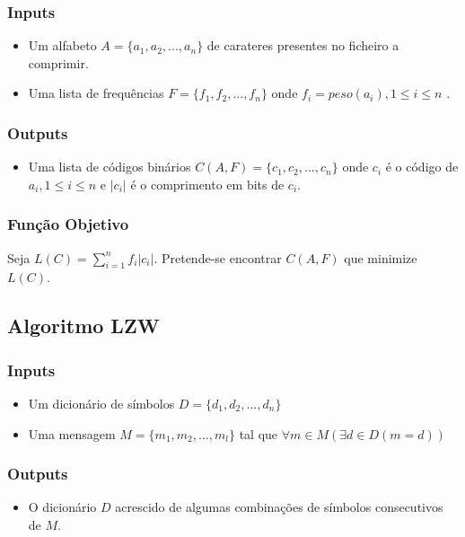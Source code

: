\documentclass[a4paper,12pt,titlepage]{article}
\begin{document}
\subsubsection*{Inputs}
\begin{itemize}
\item{Um alfabeto $A = \{a_1, a_2, ... , a_n\}$ de carateres presentes no ficheiro a comprimir.}
\item{Uma lista de frequências $F = \{f_1, f_2, ..., f_n\}$ onde $f_i = peso(a_i), 1 \leq i \leq n$ .}
\end{itemize}

\subsubsection*{Outputs}
\begin{itemize}
\item{Uma lista de códigos binários $C(A,F) = \{c_1, c_2, ..., c_n\}$ onde $c_i$ é o código de $a_i, 1 \leq i \leq n$ e $|c_i|$ é o comprimento em bits de $c_i$.}
\end{itemize}

\subsubsection*{Função Objetivo}
Seja $L(C)=\displaystyle\sum_{i=1}^{n}f_i |c_i|$. Pretende-se encontrar $C(A,F)$ que minimize $L(C)$.
\subsection{Algoritmo LZW}
\subsubsection*{Inputs}
\begin{itemize}
\item{Um dicionário de símbolos $D = \{d_1, d_2, ..., d_n\}$}
\item{Uma mensagem $M=\{m_1, m_2, ..., m_l\}$ tal que $\forall m \in M (\exists d \in D(m = d))$}
\end{itemize}
\subsubsection*{Outputs}
\begin{itemize}
\item{O dicionário $D$ acrescido de algumas combinações de símbolos consecutivos de $M$.}
\end{itemize}
\newpage
\end{document}
